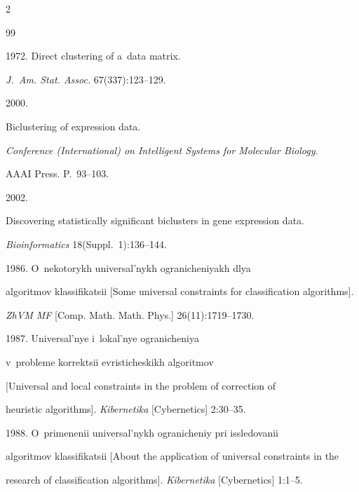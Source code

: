 \begin{multicols}{2}
{{\begin{thebibliography}{99}


 1972. Direct clustering of a~data matrix. 


\textit{J.~Am. Stat. Assoc.} 67(337):123--129.




 2000. 


Biclustering of expression data. 


\textit{Conference (International) on Intelligent Systems for Molecular Biology}.


 AAAI Press. P.~93--103.




 2002. 


Discovering statistically significant biclusters in gene expression data. 


\textit{Bioinformatics} 18(Suppl.~1):136--144.







 1986. O~nekotorykh universal'nykh ogranicheniyakh dlya 


algoritmov klassifikatsii [Some universal constraints for classification algorithms]. 


\textit{ZhVM MF} [Comp. Math. Math. Phys.] 26(11):1719--1730.







 1987. Universal'nye i~lokal'nye ogranicheniya 


v~probleme korrektsii evristicheskikh algoritmov 


[Universal and local constraints in the problem of correction of 


heuristic algorithms]. \textit{Kibernetika} [Cybernetics] 2:30--35.







 1988. O~primenenii universal'nykh ogranicheniy pri issledovanii 


algoritmov klassifikatsii [About the application of universal constraints in the 


research of classification algorithms]. \textit{Kibernetika} [Cybernetics] 1:1--5.





\end{thebibliography}}}
\end{multicols}
